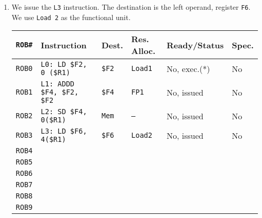 \begin{enumerate}
    
    \newpage


    \item We issue the \texttt{L3} instruction. The destination is the left operand, register \texttt{F6}. We use \texttt{Load 2} as the functional unit.
    \begin{table}[!htp]
        \centering
        \begin{adjustbox}{width={\textwidth},totalheight={\textheight},keepaspectratio}
            \begin{tabular}{@{} l l l l l l @{}}
                \toprule
                \texttt{ROB\#}  & \textbf{Instruction} & \textbf{Dest.} & \textbf{Res. Alloc.} & \textbf{Ready/Status} & \textbf{Spec.} \\
                \midrule
                \texttt{ROB0}   & \texttt{L0: LD \$F2, 0 (\$R1)}    & \texttt{\$F2} & \texttt{Load1}    & No, exec.(*)  & No    \\ [.3em]
                \texttt{ROB1}   & \texttt{L1: ADDD \$F4, \$F2, \$F2}& \texttt{\$F4} & \texttt{FP1}      & No, issued    & No    \\ [.3em]
                \texttt{ROB2}   & \texttt{L2: SD \$F4, 0(\$R1)}     & \texttt{Mem}  & \texttt{--}       & No, issued    & No    \\ [.3em]
                \texttt{ROB3}   & \texttt{L3: LD \$F6, 4(\$R1)}     & \texttt{\$F6} & \texttt{Load2}    & No, issued    & No    \\ [.3em]
                \texttt{ROB4}   &                                   &               &                   &               &       \\ [.3em]
                \texttt{ROB5}   &                                   &               &                   &               &       \\ [.3em]
                \texttt{ROB6}   &                                   &               &                   &               &       \\ [.3em]
                \texttt{ROB7}   &                                   &               &                   &               &       \\ [.3em]
                \texttt{ROB8}   &                                   &               &                   &               &       \\ [.3em]
                \texttt{ROB9}   &                                   &               &                   &               &       \\
                \bottomrule
            \end{tabular}

\end{adjustbox}
\end{table}
\end{enumerate}
